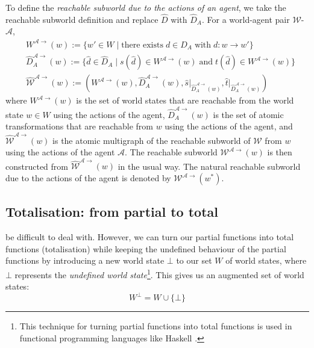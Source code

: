 To define the \emph{reachable subworld due to the actions of an agent}, we take the reachable subworld definition and replace $\hat{D}$ with $\hat{D}_{A}$.
For a world-agent pair $\mathscr{W}$-$\mathscr{A}$,
\begin{align}
	 & W^{\mathscr{A}\to}(w) := \{ w' \in W \mid \text{there exists} \; d \in D_{A} \; \text{with} \; d: w \to w' \} \\
	 & \hat{D}_{A}^{\mathscr{A}\to}(w) := \{ \hat{d} \in \hat{D}_{A} \mid s(\hat{d}) \in W^{\mathscr{A}\to}(w) \; \text{and} \; t(\hat{d}) \in W^{\mathscr{A}\to}(w) \} \\
	 & \hat{\mathscr{W}}^{\mathscr{A}\to}(w) := (W^{\mathscr{A}\to}(w), \hat{D}_{A}^{\mathscr{A}\to}(w), \hat{s} \big|_{\hat{D}_{A}^{\mathscr{A}\to}(w)}, \hat{t} \big|_{\hat{D}_{A}^{\mathscr{A}\to}(w)})
\end{align}
where $W^{\mathscr{A}\to}(w)$ is the set of world states that are reachable from the world state $w \in W$ using the actions of the agent, $\hat{D}_{A}^{\mathscr{A}\to}(w)$ is the set of atomic transformations that are reachable from $w$ using the actions of the agent, and $\hat{\mathscr{W}}^{\mathscr{A}\to}(w)$ is the atomic multigraph of the reachable subworld of $\mathscr{W}$ from $w$ using the actions of the agent $\mathscr{A}$.
The reachable subworld $\mathscr{W}^{\mathscr{A}\to}(w)$ is then constructed from $\hat{\mathscr{W}}^{\mathscr{A}\to}(w)$ in the usual way.
The natural reachable subworld due to the actions of the agent is denoted by $\mathscr{W}^{\mathscr{A}\to}(w^{*})$.


\subsection{Totalisation: from partial to total}

 be difficult to deal with.
However, we can turn our partial functions into total functions (totalisation) while keeping the undefined behaviour of the partial functions by introducing a new world state $\bot$ to our set $W$ of world states, where $\bot$ represents the \emph{undefined world state}\footnote{
    This technique for turning partial functions into total functions is used in functional programming languages like Haskell \cite{marlow2010haskell}.
}.
This gives us an augmented set of world states:
\begin{equation}
	W^{\bot} = W \cup \{ \bot \}
\end{equation}


